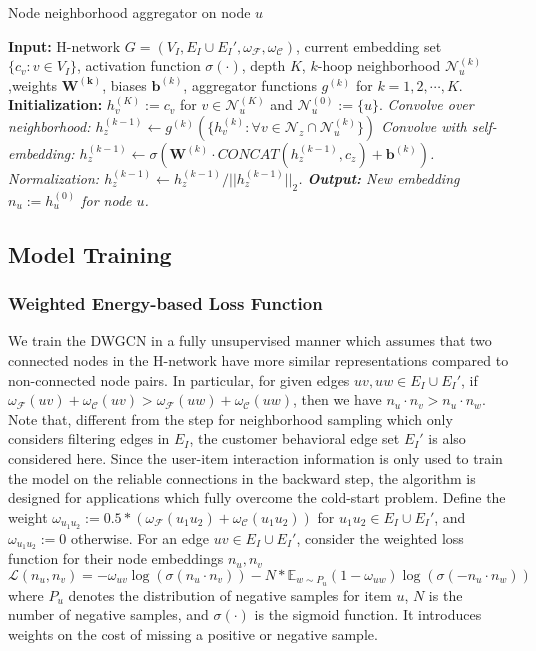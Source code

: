 \documentclass[manuscript,screen,review]{acmart}
\newcommand\Fcal{\mathcal{F}}
\newcommand{\Ccal}{\mathcal{C}}
\newcommand{\Ncal}{\mathcal{N}}
\begin{document}
\begin{algorithm}[h]
\caption{Node neighborhood aggregator on node $u$}
\label{alg:gcns}
\begin{algorithmic}[1]
\STATE \textbf{Input:} H-network $G=(V_I,E_I\cup E_I',\omega_{\mathcal{F}},\omega_{\mathcal{C}})$, current embedding set $\{c_v: v\in V_I\}$, activation function $\sigma(\cdot)$, depth $K$, $k$-hoop neighborhood $\Ncal_u^{(k)}$,weights $\mathbf{W^{(k)}}$, biases $\mathbf{b}^{(k)}$, aggregator functions $g^{(k)}$ for $k=1,2,\cdots,K$.
\STATE \textbf{Initialization:} $h_v^{(K)}:=c_v$ for $v\in \Ncal_u^{(K)}$ and $\Ncal_u^{(0)}:=\{u\}$.
\FOR{ $z\in \Ncal^{(k-1)}_u$}
\STATE \it{Convolve over neighborhood}: $h_z^{(k-1)}\leftarrow g^{(k)}\left(\{h^{(k)}_v: \forall{v}\in \Ncal_z\cap \Ncal^{(k)}_u\}\right)$
\STATE \it{Convolve with self-embedding:} $h_z^{(k-1)}\leftarrow \sigma\left(\mathbf{W}^{(k)}\cdot CONCAT(h_z^{(k-1)},c_z)+\mathbf{b}^{(k)}\right)$.
\STATE \it{Normalization: }
$h_z^{(k-1)}\leftarrow h_z^{(k-1)}/||h_z^{(k-1)}||_2$.
\ENDFOR
\ENDFOR
\STATE 
\textbf{Output:} New embedding $n_u:=h_u^{(0)}$ for node $u$.
\end{algorithmic}
\end{algorithm}



\subsection{Model Training}
\subsubsection{Weighted Energy-based Loss Function} We train the DWGCN in a fully unsupervised manner which assumes that two connected nodes in the H-network have more similar representations compared to non-connected node pairs. In particular, for given edges $uv, uw\in E_I\cup E_I'$, if $\omega_{\Fcal}(uv)+\omega_{\Ccal}(uv)> \omega_{\Fcal}(uw)+\omega_{\Ccal}(uw)$, then we have $n_u\cdot n_v> n_u\cdot n_w$. Note that, different from the step for neighborhood sampling which only considers filtering edges in $E_I$, the customer behavioral edge set $E_I'$ is also considered here. Since the user-item interaction information is only used to train the model on the reliable connections in the backward step, the algorithm is designed for applications which fully overcome the cold-start problem.
Define the weight $\omega_{u_1u_2}:=0.5*\left(\omega_{\Fcal}(u_1u_2)+\omega_{\Ccal}(u_1u_2)\right)$ for $u_1u_2\in E_I\cup E_I'$, and $\omega_{u_1u_2}:=0$ otherwise.
For an edge $uv\in E_I\cup E_I'$, consider the weighted loss function for their node embeddings $n_u,n_v$ 
\[\mathcal{L}(n_u,n_v)=-\omega_{uv}\log\left(\sigma(n_u\cdot n_v)\right)-N*\mathbb{E}_{w\sim P_u}(1-\omega_{uw})\log\left(\sigma(-n_u\cdot n_w)\right)\]
where $P_u$ denotes the distribution of negative samples for item $u$, $N$ is the number of negative samples, and $\sigma(\cdot)$ is the sigmoid function. It introduces weights on the cost of missing a positive or negative sample.
\end{document}
